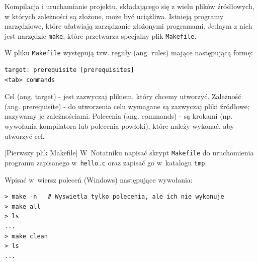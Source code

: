 Kompilacja i uruchamianie projektu, składającego się z wielu plików źródłowych, w których zależności są złożone, może być uciążliwa. Istnieją programy narzędziowe, które ułatwiają zarządzanie złożonymi programami. Jednym z nich jest narzędzie \lstinline[style=MyBashStyle]{make}, które przetwarza specjalny plik \lstinline[style=MyBashStyle]{Makefile}.

W pliku \lstinline[style=MyBashStyle]{Makefile} występują tzw. reguły (ang. rules) mające następującą formę:

\begin{lstlisting}[style=MyBashStyle]
target: prerequisite [prerequisites]
<tab> commands
\end{lstlisting}

Cel (ang. target) - jest zazwyczaj plikiem, który chcemy utworzyć. Zależność (ang. prerequisite) - do utworzenia celu wymagane są zazwyczaj pliki źródłowe; nazywamy je zależnościami. Polecenia (ang. commands) - są krokami (np. wywołania kompilatora lub polecenia powłoki), które należy wykonać, aby utworzyć cel.

\begin{example}{[Pierwszy plik Makefile]}
W~Notatniku napisać skrypt \lstinline[style=MyBashStyle]{Makefile} do uruchomienia programu zapisanego w~\lstinline[style=MyBashStyle]{hello.c} oraz zapisać go w~katalogu \lstinline[style=MyBashStyle]{tmp}.



Wpisać w~wiersz poleceń (Windows) następujące wywołania:

\begin{lstlisting}[style=MyBashStyle,caption=Pierwszy plik Makefile]
> make -n 	# Wyswietla tylko polecenia, ale ich nie wykonuje
> make all
> ls
...
> make clean
> ls
...
\end{lstlisting}

\end{example}


